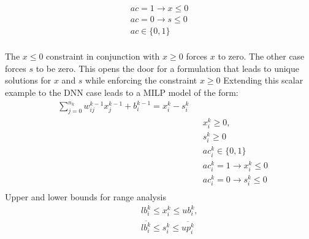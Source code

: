 \begin{equation}
\begin{aligned}
ac = 1 \rightarrow x \leq 0  \\
ac = 0 \rightarrow s \leq 0  \\
ac \in \{0,1\} \\
\end{aligned}
\end{equation}

The $x \leq 0$ constraint in conjunction with $x \geq 0$ forces $x$ to zero. The other case forces $s$ to be zero.
This opens the door for a formulation that leads to unique solutions for $x$ and $s$ while enforcing the constraint $x \geq 0$
Extending this scalar example to the DNN case leads to a \ac{MILP} model of the form:
\begin{equation}
\begin{aligned}
& \sum_{j=0}^{n_k} w_{ij}^{k-1}x_{j}^{k-1} + b_i^{k-1} = x_i^k - s_i^k  \\
& & & x_i^k \geq 0, \\
& & & s_i^k \geq 0 \\
& & & ac_i^k  \in  \{0,1\} \\
& & & ac_i^k  =  1 \rightarrow  x_i^k \leq 0  \\
& & & ac_i^k =  0 \rightarrow s_i^k  \leq 0   \\
\end{aligned}
\end{equation}
Upper and lower bounds for range analysis
\begin{equation}
\begin{aligned}
& & & lb_i^k \leq x_i^k \leq ub_i^k, \\
& & &  \overline{lb_i^k} \leq s_i^k \leq \overline{up_i^k} \\
\end{aligned}
\end{equation}


